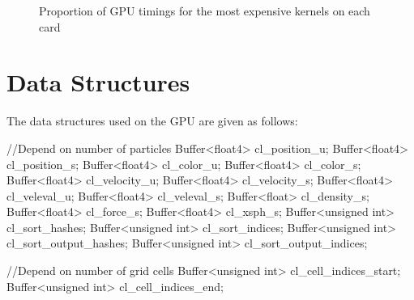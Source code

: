 \begin{figure}[!htc]
 		\centering
        \caption{ Proportion of GPU timings for the most expensive kernels on each card }
        \label{fig:pies}
\end{figure}

\section{Data Structures}
The data structures used on the GPU are given as follows:

\begin{cppcode}{0}
        //Depend on number of particles
        Buffer<float4>      cl_position_u;
        Buffer<float4>      cl_position_s;
        Buffer<float4>      cl_color_u;
        Buffer<float4>      cl_color_s;
        Buffer<float4>      cl_velocity_u;
        Buffer<float4>      cl_velocity_s;
        Buffer<float4>      cl_veleval_u;
        Buffer<float4>      cl_veleval_s;
        Buffer<float>       cl_density_s;
        Buffer<float4>      cl_force_s;
        Buffer<float4>      cl_xsph_s;
        Buffer<unsigned int>         cl_sort_hashes;
        Buffer<unsigned int>         cl_sort_indices;
        Buffer<unsigned int>         cl_sort_output_hashes;
        Buffer<unsigned int>         cl_sort_output_indices;

        //Depend on number of grid cells
        Buffer<unsigned int>         cl_cell_indices_start;
        Buffer<unsigned int>         cl_cell_indices_end;
\end{cppcode}

